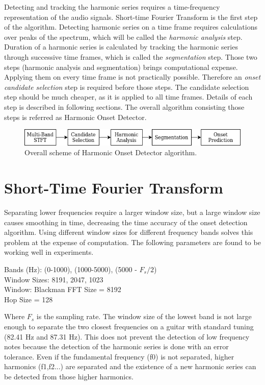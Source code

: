 Detecting and tracking the harmonic series requires a time-frequency representation of the audio signals. Short-time Fourier Transform is the first step of the algorithm. Detecting harmonic series on a time frame requires calculations over peaks of the spectrum, which will be called the \textit{harmonic analysis} step. Duration of a harmonic series is calculated by tracking the harmonic series through successive time frames, which is called the \textit{segmentation} step. Those two steps (harmonic analysis and segmentation) brings computational expense. Applying them on every time frame is not practically possible. Therefore an \textit{onset candidate selection} step is required before those steps. The candidate selection step should be much cheaper, as it is applied to all time frames. Details of each step is described in following sections. The overall algorithm consisting those steps is referred as Harmonic Onset Detector.

\begin{figure}
    \centering
    \includegraphics[width=\columnwidth]{methods/overall.png}
    \caption{Overall scheme of Harmonic Onset Detector algorithm.}
    \label{fig:scheme}
\end{figure}

\section{Short-Time Fourier Transform}
Separating lower frequencies require a larger window size, but a large window size causes smoothing in time, decreasing the time accuracy of the onset detection algorithm. Using different window sizes for different frequency bands solves this problem at the expense of computation. The following parameters are found to be working well in experiments.

Bands (Hz): (0-1000), (1000-5000), (5000 - \(F_s / 2\)) \\
Window Sizes: 8191, 2047, 1023\\
Window: Blackman
FFT Size = 8192\\
Hop Size = 128 

Where  \(F_s\) is the sampling rate. The window size of the lowest band is not large enough to separate the two closest frequencies on a guitar with standard tuning (82.41 Hz and 87.31 Hz). This does not prevent the detection of low frequency notes because the detection of the harmonic series is done with an error tolerance. Even if the fundamental frequency (f0) is not separated, higher harmonics (f1,f2...) are separated and the existence of a new harmonic series can be detected from those higher harmonics.

